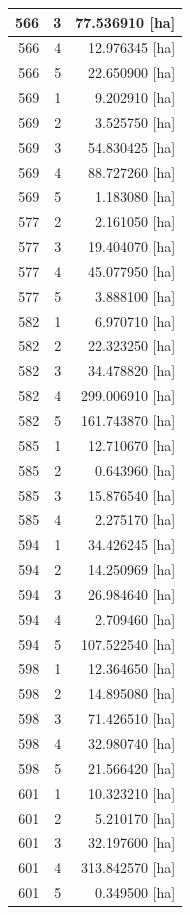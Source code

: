 \documentclass[11pt,]{book}
\begin{document}
\begin{table}
\begin{tabular}[t]{r|r|r}
\hline
566 & 3 & 77.536910 [ha]\\
\hline
566 & 4 & 12.976345 [ha]\\
\hline
566 & 5 & 22.650900 [ha]\\
\hline
569 & 1 & 9.202910 [ha]\\
\hline
569 & 2 & 3.525750 [ha]\\
\hline
569 & 3 & 54.830425 [ha]\\
\hline
569 & 4 & 88.727260 [ha]\\
\hline
569 & 5 & 1.183080 [ha]\\
\hline
577 & 2 & 2.161050 [ha]\\
\hline
577 & 3 & 19.404070 [ha]\\
\hline
577 & 4 & 45.077950 [ha]\\
\hline
577 & 5 & 3.888100 [ha]\\
\hline
582 & 1 & 6.970710 [ha]\\
\hline
582 & 2 & 22.323250 [ha]\\
\hline
582 & 3 & 34.478820 [ha]\\
\hline
582 & 4 & 299.006910 [ha]\\
\hline
582 & 5 & 161.743870 [ha]\\
\hline
585 & 1 & 12.710670 [ha]\\
\hline
585 & 2 & 0.643960 [ha]\\
\hline
585 & 3 & 15.876540 [ha]\\
\hline
585 & 4 & 2.275170 [ha]\\
\hline
594 & 1 & 34.426245 [ha]\\
\hline
594 & 2 & 14.250969 [ha]\\
\hline
594 & 3 & 26.984640 [ha]\\
\hline
594 & 4 & 2.709460 [ha]\\
\hline
594 & 5 & 107.522540 [ha]\\
\hline
598 & 1 & 12.364650 [ha]\\
\hline
598 & 2 & 14.895080 [ha]\\
\hline
598 & 3 & 71.426510 [ha]\\
\hline
598 & 4 & 32.980740 [ha]\\
\hline
598 & 5 & 21.566420 [ha]\\
\hline
601 & 1 & 10.323210 [ha]\\
\hline
601 & 2 & 5.210170 [ha]\\
\hline
601 & 3 & 32.197600 [ha]\\
\hline
601 & 4 & 313.842570 [ha]\\
\hline
601 & 5 & 0.349500 [ha]\\

\end{tabular}
\end{table}
\end{document}
